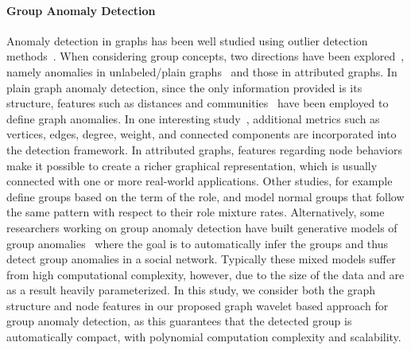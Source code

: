 \paragraph{Group Anomaly Detection}
Anomaly detection in graphs has been well studied using outlier detection methods~\cite{akoglu2009anomaly}. When considering group concepts, two directions have been explored~\cite{akoglu2015graph}, namely anomalies in unlabeled/plain graphs~\cite{noble2003graph} and those in
attributed graphs. In plain graph anomaly detection, since the only information provided is its structure, features such as distances and communities~\cite{sun2005neighborhood} have been employed to define graph anomalies. In one interesting study~\cite{henderson2010metric}, additional metrics such as vertices, edges, degree, weight, and connected components are incorporated into the detection framework. In attributed graphs, features regarding node behaviors make it possible to create a richer graphical representation, which is usually connected with one or more real-world applications. Other studies, for example~\cite{yu2014glad} define groups based on the term of the role, and model normal groups that follow the same pattern with respect to their role mixture rates. Alternatively, some researchers working on group anomaly detection have built generative models of group anomalies~\cite{xiong2011hierarchical} where the goal is to automatically infer the groups and thus detect group anomalies in a social network. Typically these mixed models suffer from high computational complexity, however, due to the size of the data and are as a result heavily parameterized. In this study, we consider both the graph structure and node features in our proposed graph wavelet based approach for group anomaly detection, as this guarantees that the detected group is automatically compact, with polynomial computation complexity and scalability.


